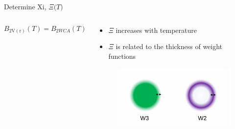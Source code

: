 \documentclass{beamer}
\begin{document}
\begin{frame}{Determine Xi, $\Xi{(}T)$}
\begin{columns}[t]
\begin{block}{}
			\begin{displaymath}B_{2\operatorname{V(r)}}(T) =B_{2WCA}(T)\end{displaymath}         
	    \end{block}
        \vspace{-0.5em}       
        \vspace{-0.5em}
        \begin{block}{}
        \begin{itemize}
			    \item $\Xi$ increases with temperature 
			    \item $\Xi$ is related to the thickness of weight functions
			\end{itemize}
	    \vspace{-2em} 
        \begin{figure}
            \centering
            \includegraphics[width=1.1\columnwidth]{figs/w2-w3-thickness.png}
          \end{figure}
	    \end{block}              
	\end{columns}	
\end{frame}
\end{document}
